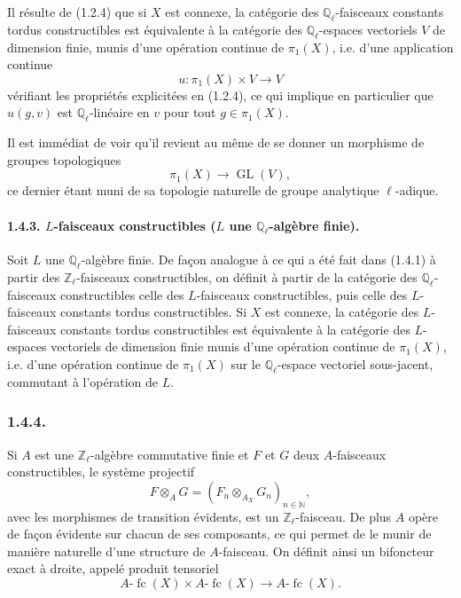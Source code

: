 \documentclass[11pt]{article}
\providecommand{\GL}{\operatorname{GL}}
\providecommand{\fc}{\operatorname{fc}}
\begin{document}
Il résulte de (1.2.4) que si \(X\) est connexe, la catégorie des \(\mathbb Q_\ell\)-faisceaux constants tordus constructibles est équivalente à la catégorie des \(\mathbb Q_\ell\)-espaces vectoriels \(V\) de dimension finie, munis d'une opération continue de \(\pi_1(X)\), i.e. d'une application continue
\[
u:\pi_1(X)\times V\longrightarrow V
\]
vérifiant les propriétés explicitées en (1.2.4), ce qui implique en particulier que \(u(g,v)\) est \(\mathbb Q_\ell\)-linéaire en \(v\) pour tout \(g\in\pi_1(X)\).

Il est immédiat de voir qu'il revient au même de se donner un morphisme de groupes topologiques
\[
\pi_1(X)\longrightarrow \GL(V),
\]
ce dernier étant muni de sa
topologie naturelle de groupe analytique \(\ell\)-adique.

\paragraph{1.4.3. \(L\)-faisceaux constructibles (\(L\) une \(\mathbb Q_\ell\)-algèbre finie).}
Soit \(L\) une \(\mathbb Q_\ell\)-algèbre finie. De façon analogue à ce qui a été fait dans (1.4.1) à partir des \(\mathbb Z_\ell\)-faisceaux constructibles, on définit à partir de la catégorie des \(\mathbb Q_\ell\)-faisceaux constructibles celle des \(L\)-faisceaux constructibles, puis celle des \(L\)-faisceaux constants tordus constructibles. Si \(X\) est connexe, la catégorie des \(L\)-faisceaux constants tordus constructibles est équivalente à la catégorie des \(L\)-espaces vectoriels de dimension finie munis d'une opération continue de \(\pi_1(X)\), i.e. d'une opération continue de \(\pi_1(X)\) sur le \(\mathbb Q_\ell\)-espace vectoriel sous-jacent, commutant à l'opération de \(L\).

\subsubsection*{1.4.4.}
Si \(A\) est une \(\mathbb Z_\ell\)-algèbre commutative finie et \(F\) et \(G\) deux \(A\)-faisceaux constructibles, le système projectif
\[
F\otimes_A G=(F_n\otimes_{A_X} G_n)_{n\in\mathbb N},
\]
avec les morphismes de transition évidents, est un \(\mathbb Z_\ell\)-faisceau. De plus \(A\) opère de façon évidente sur chacun de ses composants, ce qui permet de le munir de manière naturelle d'une structure de \(A\)-faisceau. On définit ainsi un bifoncteur exact à droite, appelé produit tensoriel
\[
A\text{-}\fc(X)\times A\text{-}\fc(X)\longrightarrow A\text{-}\fc(X).
\]
\end{document}
